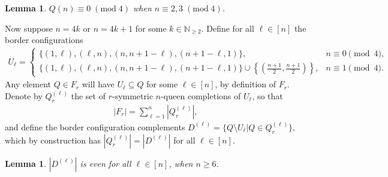 \documentclass[pdflatex,sn-mathphys-num]{sn-jnl}
\theoremstyle{thmstyleone}
\newtheorem{lemma}[theorem]{Lemma}
\theoremstyle{thmstyletwo}
\theoremstyle{thmstylethree}
\begin{document}
\begin{lemma}\label{lem:4k_4kp1_imply_Qn_div4}
    $Q(n) \equiv 0 \; (\textrm{mod} \; 4)$ when $n \equiv 2,3 \; (\textrm{mod} \; 4)$.
\end{lemma}
Now suppose $n = 4k$ or $n = 4k + 1$ for some $k \in \mathbb{N}_{\geq 2}$. Define for all $\ell \in [n]$ the border configurations
\begin{align}
    U_\ell = \begin{cases}
        \lbrace (1, \ell), ( \ell, n), (n, n+1- \ell), (n+1- \ell, 1) \rbrace, &n \equiv 0 \pmod{4}, \\
        \lbrace (1, \ell), ( \ell, n), (n, n+1- \ell), (n+1-\ell, 1) \rbrace \cup \left\lbrace \left(\frac{n+1}{2}, \frac{n+1}{2}\right) \right\rbrace, &n \equiv 1 \pmod{4}.
    \end{cases}
\end{align}
Any element $Q \in F_r$ will have $U_\ell \subseteq Q$ for some $\ell \in [n]$, by definition of $F_r$.
Denote by $Q_r^{(\ell)}$ the set of $r$-symmetric $n$-queen completions of $U_\ell$, so that
\begin{align}
    |F_r| = \sum_{\ell = 1}^{n} |Q_r^{(\ell)}|, \label{eq:Fr_decomp}
\end{align}
and define the border configuration complements $D^{(\ell)} = \lbrace Q \setminus U_\ell | Q \in Q_r^{(\ell)} \rbrace$, which 
by construction has $|Q_r^{(\ell)}| = |D^{(\ell)}|$ for all $\ell \in [n]$.
\begin{lemma} \label{lem:Dl_even}
    $|D^{(\ell)}|$ is even for all $\ell \in [n]$, when $n \geq 6$.
\end{lemma}
\end{document}
